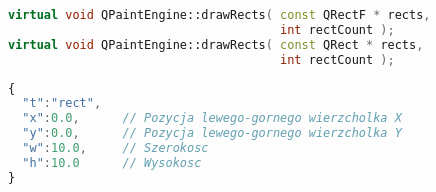\begin{lstlisting}[language=C++,numbers=none]
virtual void QPaintEngine::drawRects( const QRectF * rects, 
                                      int rectCount );
virtual void QPaintEngine::drawRects( const QRect * rects, 
                                      int rectCount );
\end{lstlisting}
\begin{lstlisting}[language=JavaScript,numbers=none]
{
  "t":"rect",
  "x":0.0,      // Pozycja lewego-gornego wierzcholka X
  "y":0.0,      // Pozycja lewego-gornego wierzcholka Y
  "w":10.0,     // Szerokosc
  "h":10.0      // Wysokosc
}
\end{lstlisting}